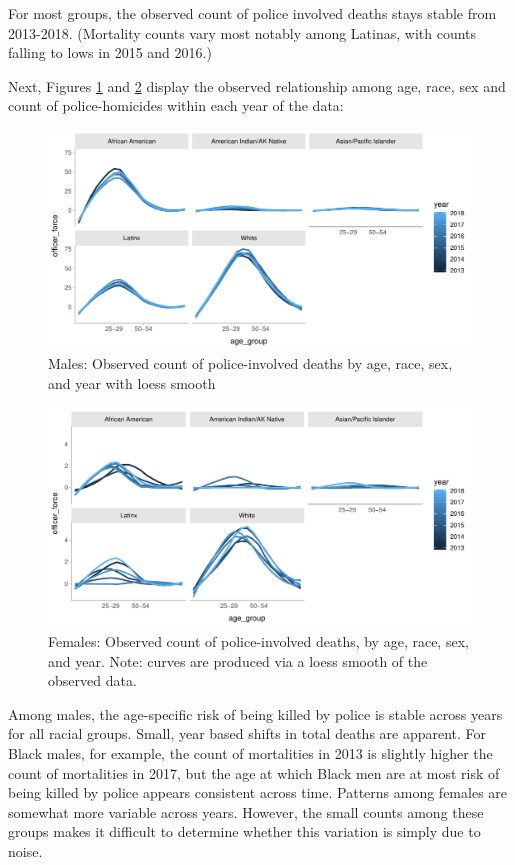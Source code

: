 \documentclass[9pt,twoside,lineno]{pnas-new}
\begin{document}
For most groups, the observed count of police involved deaths stays stable from 2013-2018. (Mortality counts vary most notably among Latinas, with counts falling to lows in 2015 and 2016.)  

Next, Figures \ref{fig:a2} and \ref{fig:a3} display the observed relationship among age, race, sex and count of police-homicides within each year of the data:

\begin{figure}[H]
\center
\includegraphics[width = \linewidth]{vis/fig_a2.pdf}
\caption{Males: Observed count of police-involved deaths by age, race, sex, and year with loess smooth}
\label{fig:a2}
\end{figure}

\begin{figure}[H]
\center
\includegraphics[width = \linewidth]{vis/fig_a3.pdf}
\caption{Females: Observed count of police-involved deaths, by age, race, sex, and year. Note: curves are produced via a loess smooth of the observed data.}
\label{fig:a3}
\end{figure}

Among males, the age-specific risk of being killed by police is stable across years for all racial groups. Small, year based shifts in total deaths are apparent. For Black males, for example, the count of mortalities in 2013 is slightly higher the count of mortalities in 2017, but the age at which Black men are at most risk of being killed by police appears consistent across time. Patterns among females are somewhat more variable across years. However, the small counts among these groups makes it difficult to determine whether this variation is simply due to noise. 
\end{document}
